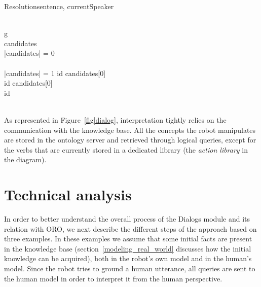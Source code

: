 \small
\begin{pseudocode}[ruled]{Resolution}{sentence, currentSpeaker}
\label{algo|Resolution}

 \GETS {} \\

\FOREACH g \in {} \DO 
\BEGIN
    \GETS {} \\
   candidates \GETS {} \\
   
   \IF \left|{candidates}\right| = 0 \THEN
    \BEGIN
       \\
      \EXIT \\
    \END
   \ELSEIF \left|{candidates}\right| = 1 \THEN
      id \GETS candidates[0] \\

   \ELSE
      \BEGIN
        \IF {} \THEN
          id \GETS candidates[0] \\
        \ELSE
          id \GETS {} \\ %
      \END \\
\END
\end{pseudocode}
\normalsize

As represented in Figure~\ref{fig|dialog}, interpretation tightly relies on the
communication with the knowledge base. All the concepts the robot manipulates
are stored in the ontology server and retrieved through logical
queries, except for the verbs that are currently stored in a dedicated library
(the \emph{action library} in the diagram).

\section{Technical analysis}
\label{examples}

In order to better understand the overall process of the {\sc Dialogs} module
and its relation with ORO, we next describe the different steps of the approach
based on three examples. In these examples we assume that some initial facts
are present in the knowledge base (section~\ref{modeling_real_world} discusses
how the initial knowledge can be acquired), both in the robot's own model and
in the human's model.  Since the robot tries to ground a human utterance, all
queries are sent to the human model in order to interpret it from the human
perspective.

